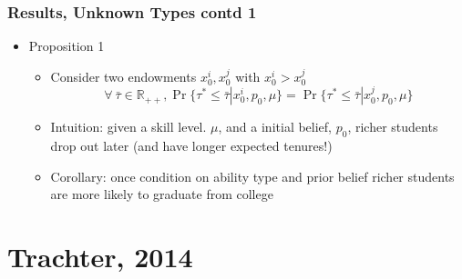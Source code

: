 \begin{frame}
	\frametitle{Results, Unknown Types contd 1}
		\begin{itemize}
			\item Proposition 1
				\begin{itemize}
					\item Consider two endowments $x_{0}^i, x_{0}^j$ with $x_{0}^i > x_{0}^j$
					\begin{equation}
					\forall \ \bar{\tau} \in \mathbb{R}_{++}, \Pr \{ \tau^* \leq \bar{\tau} | x_{0}^i, p_{0}, \mu \} = \Pr \{ \tau^* \leq \bar{\tau} | x_{0}^j, p_{0}, \mu \}
					\end{equation}
					\item Intuition: given a skill level. $\mu$, and a initial belief, $p_{0}$, richer students drop out later (and have longer expected tenures!)
					\item Corollary: once condition on ability type and prior belief richer students are more likely to graduate from college
				\end{itemize}
		\end{itemize}
\end{frame}

\section{Trachter, 2014}

